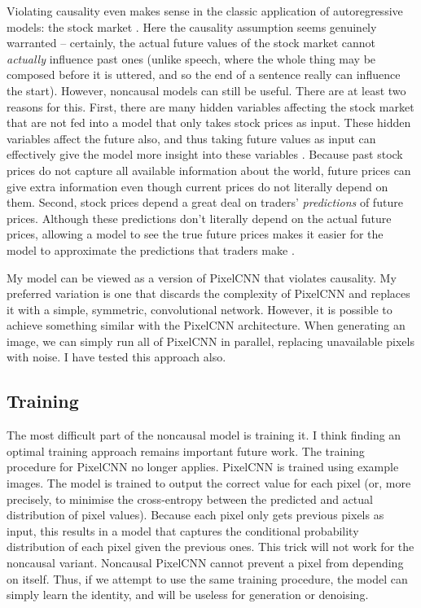 \documentclass[11pt, a4paper]{book}
\begin{document}
Violating causality even makes sense in the classic application of autoregressive models: the stock market \citep{noncausaleco1}. Here the causality assumption seems genuinely warranted -- certainly, the actual future values of the stock market cannot \emph{actually} influence past ones (unlike speech, where the whole thing may be composed before it is uttered, and so the end of a sentence really can influence the start). However, noncausal models can still be useful. There are at least two reasons for this. First, there are many hidden variables affecting the stock market that are not fed into a model that only takes stock prices as input. These hidden variables affect the future also, and thus taking future values as input can effectively give the model more insight into these variables \citep{noncausaleco1}. Because past stock prices do not capture all available information about the world, future prices can give extra information even though current prices do not literally depend on them. Second, stock prices depend a great deal on traders' \emph{predictions} of future prices. Although these predictions don't literally depend on the actual future prices, allowing a model to see the true future prices makes it easier for the model to approximate the predictions that traders make \citep{noncausaleco1}.

My model can be viewed as a version of PixelCNN that violates causality. My preferred variation is one that discards the complexity of PixelCNN and replaces it with a simple, symmetric, convolutional network. However, it is possible to achieve something similar with the PixelCNN architecture. When generating an image, we can simply run all of PixelCNN in parallel, replacing unavailable pixels with noise. I have tested this approach also.

\subsection{Training}

The most difficult part of the noncausal model is training it. I think finding an optimal training approach remains important future work. The training procedure for PixelCNN no longer applies. PixelCNN is trained using example images. The model is trained to output the correct value for each pixel (or, more precisely, to minimise the cross-entropy between the predicted and actual distribution of pixel values). Because each pixel only gets previous pixels as input, this results in a model that captures the conditional probability distribution of each pixel given the previous ones. This trick will not work for the noncausal variant. Noncausal PixelCNN cannot prevent a pixel from depending on itself. Thus, if we attempt to use the same training procedure, the model can simply learn the identity, and will be useless for generation or denoising.
\end{document}
